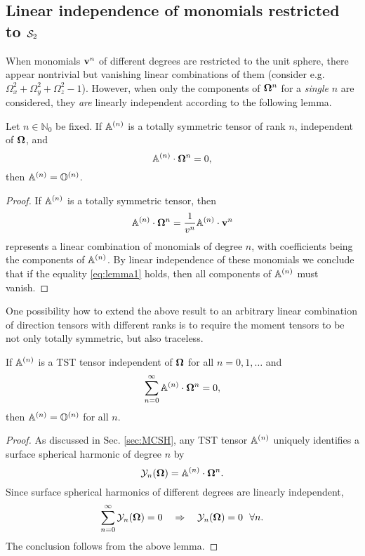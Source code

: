 \subsection{Linear independence of monomials restricted to $\Sphere$}
When monomials $\bv^n$ of different degrees are restricted to the unit sphere, there appear nontrivial but vanishing
linear combinations of them (consider e.g. \linebreak\mbox{$\Omega_x^2 + \Omega_y^2 + \Omega_z^2 - 1$}). However, when
only the components of $\bomega^n$ for a \textsl{single} $n$ are considered, they \textsl{are} linearly independent according to
the following lemma.
\begin{lemma}
  Let $n\in\mathbb{N}_0$ be fixed. If $\AA$ is a totally symmetric tensor of rank $n$, independent of $\bomega$, and
  \begin{equation}\label{eq:lemma1}
    \AA\contr\bomega^n = 0,
  \end{equation}
  then $\AA = \mathbb{O}^{(n)}$.
\end{lemma}
\begin{proof}
  If $\AA$ is a totally symmetric tensor, then 
  $$
    \AA\contr\bomega^n = \frac{1}{v^n}\AA\contr\bv^n
  $$
  represents a linear combination of monomials of degree $n$,  with coefficients being the components of $\AA$. By 
  linear independence of these monomials we conclude that if the equality \eqref{eq:lemma1} holds, then all components 
  of $\AA$ must vanish.
\end{proof}

One possibility how to extend the above result to an arbitrary linear combination of direction tensors with different
ranks is to require the moment tensors to be not only totally symmetric, but also traceless.

\begin{theorem}\label{thm:MC-suffcond}
  If $\AA$ is a TST tensor independent of $\bomega$ for all $n = 0,1,\ldots$ and
  $$
    \suma[n]{0}{\infty}\AA\contr\bomega^n = 0,
  $$
  then $\AA = \mathbb{O}^{(n)}$ for all $n$.
\end{theorem}
\begin{proof}
  As discussed in Sec. \ref{sec:MCSH}, any TST tensor $\AA$ uniquely identifies a surface spherical harmonic of degree 
  $n$ by 
  $$
    \mathcal{Y}_n(\bomega) = \AA\contr\bomega^n.
  $$
  Since surface spherical harmonics of different degrees are linearly independent,
  $$
    \suma[n]{0}{\infty} \mathcal{Y}_n(\bomega) = 0\quad \Rightarrow \quad \mathcal{Y}_n(\bomega) = 0 \ \ \forall{n}.
  $$
  The conclusion follows from the above lemma.
\end{proof}

